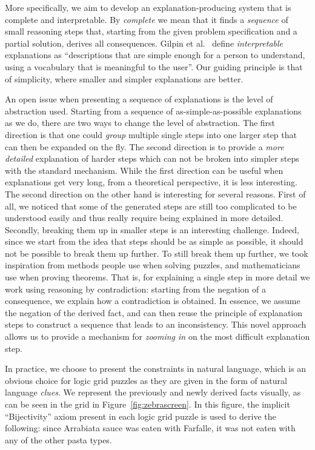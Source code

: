 More specifically, we aim to develop an explanation-producing system that is complete and interpretable. 
By \emph{complete} we mean that it finds a \emph{sequence} of small reasoning steps that, starting from the given problem specification and a partial solution, derives all consequences. 
Gilpin et al.~\cite{DBLP:conf/dsaa/GilpinBYBSK18} define \emph{interpretable} explanations as ``descriptions that are simple enough for a person to understand, using a vocabulary that is meaningful to the user''. 
Our guiding principle is that of simplicity, where smaller and simpler explanations are better. 

An open issue when presenting a sequence of explanations is the level of abstraction used.
Starting from a sequence of as-simple-as-possible explanations as we do, there are two ways to change the level of abstraction.
The first direction is that one could \emph{group} multiple single steps into one larger step that can then be expanded on the fly. 
The second direction is to provide a \emph{more detailed} explanation of harder steps which can not be broken into simpler steps with the standard mechanism.
While the first direction can be useful when explanations get very long, from a theoretical perspective, it is less interesting. 
The second direction on the other hand is interesting for several reasons. First of all, we noticed that some of the generated steps are still too complicated to be understood easily and thus really require being explained in more detailed. Secondly, breaking them up in smaller steps is an interesting challenge. Indeed, since we start from the idea that steps should be as simple as possible, it should not be possible to break them up further. 
To still break them up further, we took inspiration from methods people use when solving puzzles, and mathematicians use when proving theorems. 
That is, for explaining a single step in more detail we work using reasoning by contradiction: starting from the negation of a consequence, we explain how a contradiction is obtained.  In essence, we assume the negation of the derived fact, and can then reuse the principle of explanation steps to construct a sequence that leads to an inconsistency. 
This novel approach allows us to provide a mechanism for \emph{zooming in} on the most difficult explanation step.

In practice, we choose to present the constraints in natural language, which is an obvious choice for logic grid puzzles as they are given in the form of natural language \textit{clues}. 
We represent the previously and newly derived facts visually, as can be seen in the grid in Figure~\ref{fig:zebrascreen}. In this figure, the implicit ``Bijectivity'' axiom present in each logic grid puzzle is used to derive the following: since Arrabiata sauce was eaten with Farfalle, it was not eaten with any of the other pasta types.

